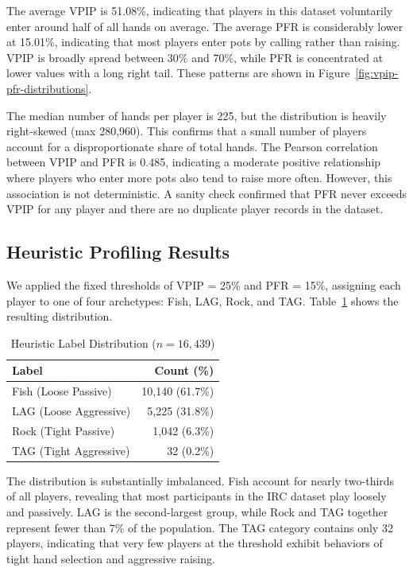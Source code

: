 \documentclass[sigconf]{acmart}
\begin{document}
The average VPIP is 51.08\%, indicating that players in this dataset voluntarily enter around half of all hands on average. The average PFR is considerably lower at 15.01\%, indicating that most players enter pots by calling rather than raising. VPIP is broadly spread between 30\% and 70\%, while PFR is concentrated at lower values with a long right tail. These patterns are shown in Figure~\ref{fig:vpip-pfr-distributions}. 

The median number of hands per player is 225, but the distribution is heavily right-skewed (max 280,960). This confirms that a small number of players account for a disproportionate share of total hands. The Pearson correlation between VPIP and PFR is 0.485, indicating a moderate positive relationship where players who enter more pots also tend to raise more often. However, this association is not deterministic. A sanity check confirmed that PFR never exceeds VPIP for any player and there are no duplicate player records in the dataset.

\subsection{Heuristic Profiling Results}
We applied the fixed thresholds of VPIP = 25\% and PFR = 15\%, assigning each player to one of four archetypes: Fish, LAG, Rock, and TAG. Table~\ref{tab:heuristic-counts} shows the resulting distribution.

\begin{table}[t]
  \caption{Heuristic Label Distribution ($n=16{,}439$)}
  \label{tab:heuristic-counts}
  \centering
  \begin{tabular}{lr}
    \toprule
    Label & Count (\%) \\
    \midrule
    Fish (Loose Passive) & 10,140 (61.7\%) \\
    LAG (Loose Aggressive) & 5,225 (31.8\%) \\
    Rock (Tight Passive) & 1,042 (6.3\%) \\
    TAG (Tight Aggressive) & 32 (0.2\%) \\
    \bottomrule
  \end{tabular}
\end{table}

The distribution is substantially imbalanced. Fish account for nearly two-thirds of all players, revealing that most participants in the IRC dataset play loosely and passively. LAG is the second-largest group, while Rock and TAG together represent fewer than 7\% of the population. The TAG category contains only 32 players, indicating that very few players at the threshold exhibit behaviors of tight hand selection and aggressive raising. 
\end{document}
